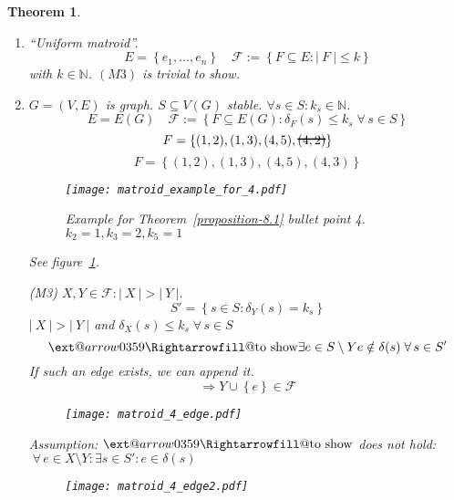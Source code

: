 \documentclass{article}
\makeatletter
\newtheorem{theorem}{Theorem}
\newcommand{\card}[1]{\left|\:\!#1\:\!\right|}
\newcommand{\set}[1]{\left\{#1\right\}}
\newcommand{\fall}{\;\forall\,}
\newcommand{\xRightarrow}[2][]{\ext@arrow 0359\Rightarrowfill@{#1}{#2}}
\newcommand\hcancel[2][black]{\setbox0=\hbox{$#2$}%
\rlap{\raisebox{.45\ht0}{\textcolor{#1}{\rule{\wd0}{1pt}}}}#2}
\makeatother
\begin{document}
\begin{theorem}
\begin{enumerate}
    \item ``\emph{Uniform matroid}''. 
      \[ E = \set{e_1, \ldots, e_n} \quad \mathcal{F} := \set{F \subseteq E: \card{F} \leq k} \]
      with $k \in \mathbb{N}$. $(M3)$ is trivial to show.

    \item $G = (V, E)$ is graph. $S \subseteq V(G)$ stable. $\forall s \in S: k_s \in \mathbb{N}$.
      \[ E = E(G) \quad \mathcal{F} := \set{F \subseteq E(G): \delta_F(s) \leq k_s \fall s \in S} \]
      \[ F = \set{(1, 2), (1, 3), (4, 5), \hcancel{(4, 2)}} \]
      \[ F = \set{(1, 2), (1, 3), (4, 5), (4, 3)} \]

      \begin{figure}[!ht]
        \begin{center}
          \texttt{[image: matroid\_example\_for\_4.pdf]}
          \caption{Example for Theorem~\ref{proposition-8.1} bullet point 4. $k_2 = 1, k_3 = 2, k_5 = 1$}
          \label{fig:prop81-4-example}
        \end{center}
      \end{figure}

      See figure~\ref{fig:prop81-4-example}.

      (M3) $X, Y \in \mathcal{F}: \card{X} > \card{Y}$.
      \[
        S' = \set{s \in S: \delta_Y(s) = k_s}
      \]
      $\card{X} > \card{Y}$ and $\delta_X(s) \leq k_s \fall s \in S$
      \[
        \xRightarrow{\text{to show}} 
          \exists e \in S \setminus Y
          e \notin \delta(s)
          \fall s \in S'
      \]
      If such an edge exists, we can append it.
      \[
        \Rightarrow Y \cup \set{e} \in \mathcal{F}
      \]

      \begin{figure}[!ht]
        \begin{center}
          \texttt{[image: matroid\_4\_edge.pdf]}
          \label{fig:prop81-4-edge}
        \end{center}
      \end{figure}

      Assumption: $\xRightarrow{\text{to show}}$ does \emph{not} hold:
      $\fall e \in X \setminus Y: \exists s \in S': e \in \delta(s)$

      \begin{figure}[!ht]
        \begin{center}
          \texttt{[image: matroid\_4\_edge2.pdf]}
          \label{fig:prop81-4-edge2}
        \end{center}
      \end{figure}


\end{enumerate}
\end{theorem}
\end{document}
